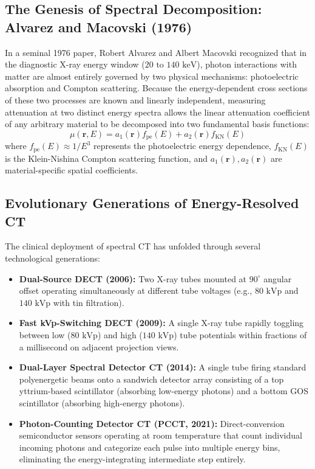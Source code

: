 \documentclass[11pt,a4paper]{article}
\begin{document}
\subsection{The Genesis of Spectral Decomposition: Alvarez and Macovski (1976)}
In a seminal 1976 paper, Robert Alvarez and Albert Macovski recognized that in the diagnostic X-ray energy window ($20\text{ to }140\text{ keV}$), photon interactions with matter are almost entirely governed by two physical mechanisms: photoelectric absorption and Compton scattering. Because the energy-dependent cross sections of these two processes are known and linearly independent, measuring attenuation at two distinct energy spectra allows the linear attenuation coefficient of any arbitrary material to be decomposed into two fundamental basis functions:
\begin{equation}
    \mu(\mathbf{r}, E) = a_1(\mathbf{r}) f_{\text{pe}}(E) + a_2(\mathbf{r}) f_{\text{KN}}(E)
\end{equation}
where $f_{\text{pe}}(E) \approx 1/E^3$ represents the photoelectric energy dependence, $f_{\text{KN}}(E)$ is the Klein-Nishina Compton scattering function, and $a_1(\mathbf{r}), a_2(\mathbf{r})$ are material-specific spatial coefficients.

\subsection{Evolutionary Generations of Energy-Resolved CT}
The clinical deployment of spectral CT has unfolded through several technological generations:
\begin{itemize}[leftmargin=2em]
    \item \textbf{Dual-Source DECT (2006):} Two X-ray tubes mounted at $90^\circ$ angular offset operating simultaneously at different tube voltages (e.g., $80\text{ kVp}$ and $140\text{ kVp}$ with tin filtration).
    \item \textbf{Fast kVp-Switching DECT (2009):} A single X-ray tube rapidly toggling between low ($80\text{ kVp}$) and high ($140\text{ kVp}$) tube potentials within fractions of a millisecond on adjacent projection views.
    \item \textbf{Dual-Layer Spectral Detector CT (2014):} A single tube firing standard polyenergetic beams onto a sandwich detector array consisting of a top yttrium-based scintillator (absorbing low-energy photons) and a bottom GOS scintillator (absorbing high-energy photons).
    \item \textbf{Photon-Counting Detector CT (PCCT, 2021):} Direct-conversion semiconductor sensors operating at room temperature that count individual incoming photons and categorize each pulse into multiple energy bins, eliminating the energy-integrating intermediate step entirely.
\end{itemize}
\end{document}
